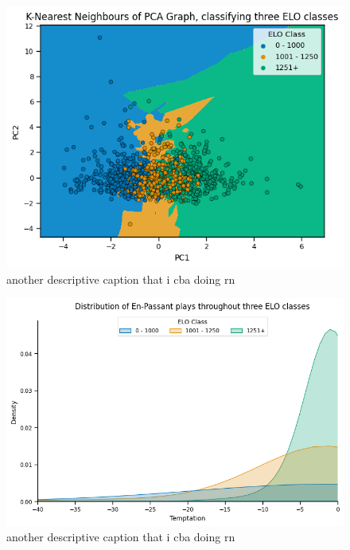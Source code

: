 \documentclass[10pt,a4paper,twocolumn]{article}
\begin{document}
\begin{figure}[t]
  \centering
  \includegraphics{report/images/knn_graph.png}
  \caption{another descriptive caption that i cba doing rn}
  \label{fds-project-template:fig:knn}
\end{figure}

\begin{figure}[t]
  \centering
  \includegraphics{report/images/ep_distplot.png}
  \caption{another descriptive caption that i cba doing rn}
  \label{fds-project-template:fig:knn}
\end{figure}

\end{document}
